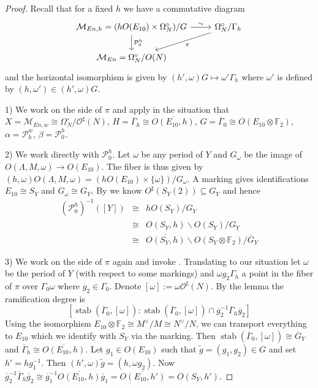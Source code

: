 \documentclass{amsart}
\theoremstyle{definition}
\theoremstyle{plain}
\DeclareMathOperator{\stab}{stab}
\newcommand{\FF}{\mathbb{F}}
\newcommand{\M}{\mathcal{M}}
\renewcommand{\O}{\mathcal{O}}
\renewcommand{\P}{\mathcal{P}}
\newcommand{\Gbar}{\overline{G}}
\begin{document}
\begin{proof}
Recall that for a fixed $h$ we have a commutative diagram
\begin{equation}\label{eq:ramification}\begin{tikzcd}
    \M_{En,h} =(hO(E_{10}) \times \Omega_N^\circ)/G \arrow[r]{}{\sim}\arrow[d]{}{\P^h_0} & \Omega_N^\circ/\Gamma_h \arrow[ld]{}{\pi}\\
    \M_{En} = \Omega_N^\circ/O(N)&
\end{tikzcd}
\end{equation}
and the horizontal isomorphism is given by $(h',\omega)G \mapsto \omega' \Gamma_h $ where $\omega'$ is defined by  $(h,\omega') \in (h',\omega)G$.

1) We work on the side of $\pi$ and apply  in the situation that
 $X = \M_{En,w}\cong \Omega_N^\circ/\O^\sharp(N)$, $H = \overline{\Gamma}_h \cong \overline{O(E_{10},h)}$, $G=\overline{\Gamma}_0 \cong O(E_{10} \otimes \FF_2)$, $\alpha = \P^w_h$, $\beta=\P^h_0$.

2) We work directly with $\P^h_0$.
Let $\omega$ be any period of $Y$ and $G_\omega$ be the image of $O(\Lambda,M,\omega) \to O(E_{10})$. The fiber is thus given by
$(h,\omega)O(\Lambda,M, \omega) = (hO(E_{10})\times \{\omega\})/G_\omega $. A marking gives identifications $E_{10}\cong S_Y$ and
$G_\omega \cong G_Y$.
By  we know $O^\sharp(S_Y(2)) \subseteq G_Y$ and hence
\begin{eqnarray*}
\left(\P_0^h\right)^{-1}([Y]) &\cong&  hO(S_Y)/ G_Y \\
&\cong&  O(S_Y,h) \backslash O(S_Y) / G_Y \\
&\cong&  \overline{O(S_Y,h)} \backslash O(S_Y\otimes \FF_2) / \Gbar_Y
\end{eqnarray*}

3) We work on the side of $\pi$ again and invoke .
Translating to our situation let $\omega$ be the period of $Y$ (with respect to some markings) and
$\omega g_2 \Gamma_h$ a point in the fiber of $\pi$ over $\Gamma_0 \omega$ where $g_2 \in \Gamma_0$.
Denote $[\omega]:= \omega\O^\sharp(N)$.
By the lemma the ramification degree is
\[[\stab(\overline{\Gamma}_0,[\omega]): \stab(\overline{\Gamma}_0,[\omega]) \cap \overline{g}_2^{-1} \overline{\Gamma}_h \overline{g}_2] \]
Using the isomorphism $E_{10}\otimes \FF_2 \cong M^\vee/M \cong N^\vee /N$, we can transport everything to $E_{10}$ which we identify with $S_Y$ via the marking. Then $\stab(\overline{\Gamma}_0, [\omega]) \cong \Gbar_Y$ and $\overline{\Gamma}_h \cong \overline{O(E_{10},h)}$.
Let $g_1 \in O(E_{10})$ such that $\tilde{g} = (g_1,g_2) \in G$ and set $h' = h{g_1^{-1}}$.
Then $(h',\omega)\tilde g = (h, \omega g_2)$. Now $\overline{g}_2^{-1} \overline{\Gamma}_h \overline{g}_2 \cong \overline{g}_1^{-1} \overline{O(E_{10},h)} \overline{g}_1 = \overline{O(E_{10},h')}= O(S_Y, h')$.
\end{proof}
\end{document}
